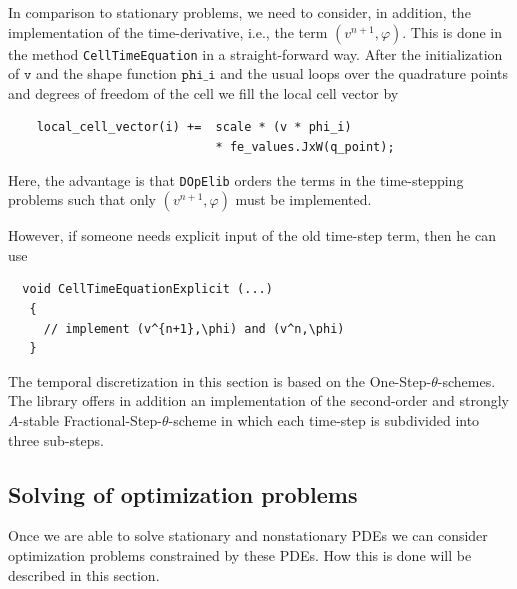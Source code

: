 \documentclass[smallextended]{svjour3}       %
\numberwithin{equation}{section}
\renewcommand{\phi}{\varphi}
\newcommand{\dope}{\texttt{DOpElib}}
\begin{document}
In comparison to stationary problems, we need to consider, in addition, 
the implementation
of the time-derivative, i.e., the term $ (v^{n+1},\phi)$. This is done
in the method \texttt{CellTimeEquation} in a straight-forward way. After the initialization of $\texttt{v}$ and the shape function $\texttt{phi\_i}$ and the usual loops over the quadrature points and  degrees of freedom of the cell we fill the local cell vector by
\begin{lstlisting}
    local_cell_vector(i) +=  scale * (v * phi_i)  
                             * fe_values.JxW(q_point);    
\end{lstlisting}
Here, the advantage is that \dope{} orders the terms in the time-stepping
problems
such that only $(v^{n+1},\phi)$ must be implemented. 



\begin{remark}
However, if someone 
needs explicit input of the old time-step term, then he can use 
\begin{lstlisting}
  void CellTimeEquationExplicit (...)
   {
     // implement (v^{n+1},\phi) and (v^n,\phi)  
   }
\end{lstlisting}
\end{remark}

\begin{remark}
The temporal discretization in this section 
is based on the One-Step-$\theta$-schemes. The library
offers in addition an implementation 
of the second-order and strongly $A$-stable 
Fractional-Step-$\theta$-scheme in which 
each time-step is subdivided into three 
sub-steps. 
\end{remark}

\subsection{Solving of optimization problems}\label{sec:opt}
Once we are able to solve stationary and nonstationary PDEs
we can consider optimization problems constrained by these PDEs.
How this is done will be described in this section. 
\end{document}
